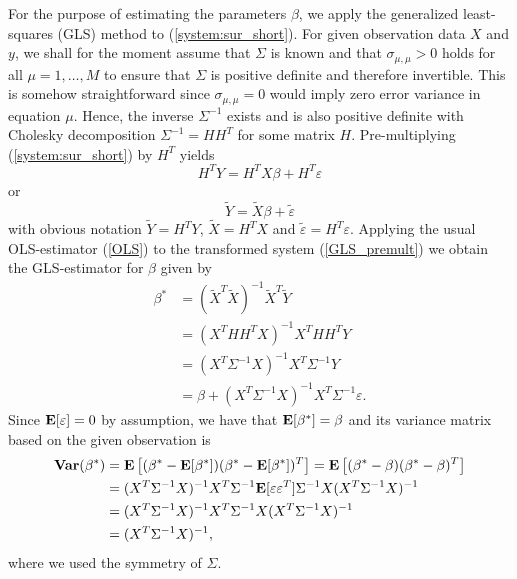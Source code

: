 \documentclass[a4paper, 11pt]{scrreprt}
\newcommand{\ew}{\mbox{\textbf{E}}}
\newcommand{\var}{\mbox{\textbf{Var}}}
\begin{document}
For the purpose of estimating the parameters $\beta$, we apply the generalized least-squares (GLS) method to (\ref{system:sur_short}).
For given observation data $X$ and $y$, we shall for the moment assume that $\Sigma$ is known and that $\sigma_{\mu,\mu} > 0$ holds for all $\mu =1,\ldots,M$ to ensure that $\Sigma$ is positive definite and therefore invertible. This is somehow straightforward since $\sigma_{\mu,\mu}=0$ would imply zero error variance in equation $\mu$. Hence, the inverse $\Sigma^{-1}$ exists and is also positive definite with Cholesky decomposition $\Sigma^{-1} = H H^T$ for some matrix $H$. 
Pre-multiplying (\ref{system:sur_short}) by $H^T$ yields
\begin{equation}
H^T Y=H^T X\beta+H^T \varepsilon
\end{equation}
or 
\begin{equation}\label{GLS_premult}
\tilde{Y} = \tilde{X}\beta + \tilde{\varepsilon}
\end{equation}
with obvious notation $\tilde{Y} = H^T Y$, $\tilde{X} = H^T X$ and $\tilde{\varepsilon} = H^T \varepsilon$. Applying the usual OLS-estimator (\ref{OLS}) to the transformed system (\ref{GLS_premult}) we obtain the GLS-estimator for $\beta$ given by
\begin{align}
\beta^* &= (\tilde{X}^T \tilde{X})^{-1} \tilde{X}^T \tilde{Y} \nonumber \\
&= (X^T H H^T X)^{-1}X^T H H^T Y \nonumber \\
&= (X^T \Sigma^{-1} X)^{-1} X^T \Sigma^{-1} Y \label{GLS} \\
& = \beta + (X^T \Sigma^{-1} X)^{-1} X^T \Sigma^{-1} \varepsilon. \nonumber
\end{align}
Since $\ew[\varepsilon] = 0$ by assumption, we have that $\ew[\beta^*] = \beta$ and its variance matrix based on the given observation is
\begin{align*}
\var(\beta^*) &= \ew\left[(\beta^* - \ew[\beta^*])(\beta^* - \ew[\beta^*])^T\right] = \ew\left[(\beta^* - \beta)(\beta^* - \beta)^T\right] \\
 &= (X^T \Sigma^{-1} X)^{-1} X^T \Sigma^{-1} \ew[ \varepsilon \varepsilon^T ]  \Sigma^{-1} X (X^T \Sigma^{-1} X)^{-1} \\
 &= (X^T \Sigma^{-1} X)^{-1} X^T  \Sigma^{-1} X (X^T \Sigma^{-1} X)^{-1} \\
 &= (X^T \Sigma^{-1} X)^{-1},
\end{align*}
where we used the symmetry of $\Sigma$.
\end{document}
